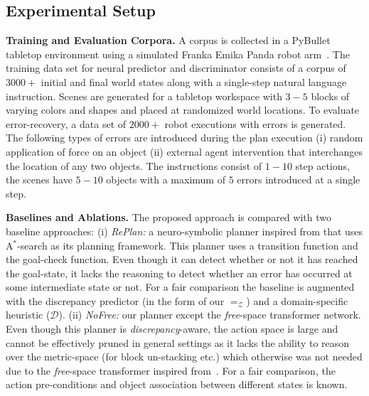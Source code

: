 \subsection{Experimental Setup}\label{sec:experiments}

\textbf{Training and Evaluation Corpora. } 
%
A corpus is collected in a PyBullet tabletop environment using a simulated Franka Emika Panda robot arm~\citep{haddadin2022franka}. The training data set for neural predictor and discriminator consists of a corpus of $3000+$ initial and final world states along with a single-step natural language instruction. 
%
Scenes are generated for a tabletop workspace with $3-5$ blocks of varying colors and shapes and placed at randomized world locations. 
%
To evaluate error-recovery, a data set of $2000+$ robot executions with errors is generated. The following types of errors are introduced during the plan execution (i) random application of force on an object (ii) external agent intervention that interchanges the location of any two objects. The instructions consist of $1-10$ step actions, the scenes have $5-10$ objects 
with a maximum of $5$ errors introduced at a single step.

\textbf{Baselines and Ablations. }\label{subsec:baseline}
The proposed approach is compared with two baseline approaches: (i) \emph{RePlan:} a neuro-symbolic planner inspired from \cite{mao2022pdsketch} that uses A$^*$-search as its planning framework. This planner uses a transition function and the goal-check function. Even though it can detect whether or not it has reached the goal-state, it lacks the reasoning to detect whether an error has occurred at some intermediate state or not. For a fair comparison the baseline is augmented with the discrepancy predictor (in the form of our $=_\mathcal{Z}$) and a domain-specific heuristic ($\mathcal{D}$). (ii) \emph{NoFree:} our planner except the \textit{free}-space transformer network. Even though this planner is \textit{discrepancy}-aware, the action space is large and cannot be effectively pruned in general settings as it lacks the ability to reason over the metric-space (for block un-stacking etc.) which otherwise was not needed due to the \textit{free}-space transformer inspired from~\citep{liu2022structdiffusion}. For a fair comparison, the action pre-conditions and object association between different states is known. 

